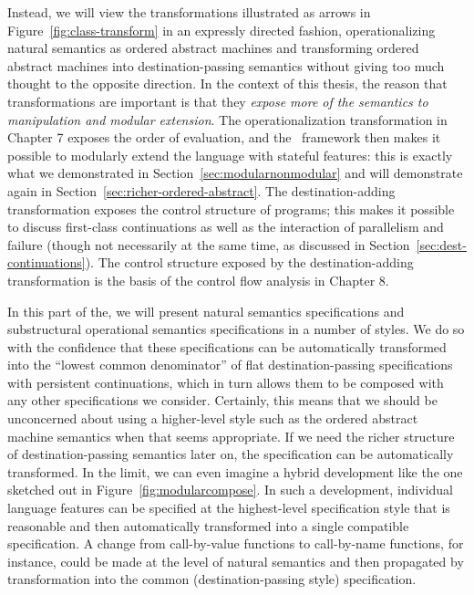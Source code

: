 Instead, we will view the transformations illustrated as arrows in
Figure~\ref{fig:class-transform} in an expressly directed fashion,
operationalizing natural semantics as ordered abstract machines and
transforming ordered abstract machines into destination-passing
semantics without giving too much thought to the opposite
direction. In the context of this thesis, the reason that
transformations are important is that they {\it expose more of the
  semantics to manipulation and modular extension}.  The
operationalization transformation in Chapter 7 exposes the order of
evaluation, and the \sls~framework then makes it possible to modularly
extend the language with stateful features: this is exactly what we
demonstrated in Section~\ref{sec:modularnonmodular} and will
demonstrate again in Section~\ref{sec:richer-ordered-abstract}.  The
destination-adding transformation exposes the control structure of
programs; this makes it possible to discuss first-class continuations
as well as the interaction of parallelism and failure (though not
necessarily at the same time, as discussed in
Section~\ref{sec:dest-continuations}).  The control structure exposed
by the destination-adding transformation is the basis of the control
flow analysis in Chapter 8.

In this part of the, we will present natural semantics specifications
and substructural operational semantics specifications in a number of
styles. We do so with the confidence that these specifications can be
automatically transformed into the ``lowest common denominator'' of
flat destination-passing specifications with persistent continuations,
which in turn allows them to be composed with any other specifications
we consider. Certainly, this means that we should be unconcerned about
using a higher-level style such as the ordered abstract machine
semantics when that seems appropriate. If we need the richer structure
of destination-passing semantics later on, the specification can be
automatically transformed. In the limit, we can even imagine a hybrid
development like the one sketched out in
Figure~\ref{fig:modularcompose}. In such a development, individual
language features can be specified at the highest-level specification
style that is reasonable and then automatically transformed into a
single compatible specification. A change from call-by-value functions
to call-by-name functions, for instance, could be made at the level of
natural semantics and then propagated by transformation into the
common (destination-passing style) specification.



